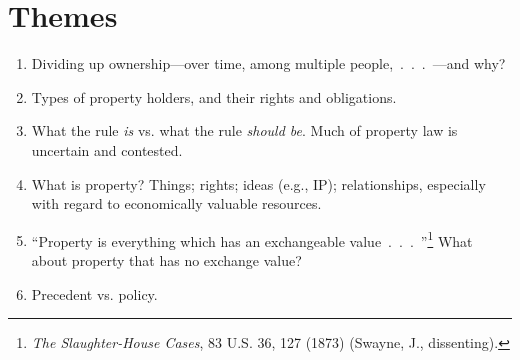 \section{Themes}

\begin{enumerate}
    \item Dividing up ownership---over time, among multiple 
    people,~.~.~.~---and why?
    \item Types of property holders, and their rights and obligations.
    \item What the rule \emph{is} vs. what the rule \emph{should be}. Much of 
    property law is uncertain and contested.
    \item What is property? Things; rights; ideas (e.g., IP); relationships, 
    especially with regard to economically valuable resources.
    \item ``Property is everything which has an exchangeable 
    value~.~.~.~''\footnote{\emph{The Slaughter-House Cases}, 83 U.S. 36, 127 
    (1873) (Swayne, J., dissenting).} What about property that has no exchange value?
    \item Precedent vs. policy.
\end{enumerate}

